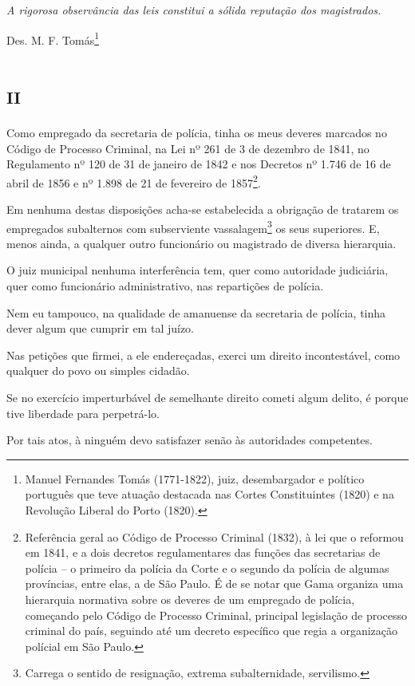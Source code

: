 \emph{A rigorosa observância das leis constitui a sólida reputação dos
magistrados.}

Des. M. F. Tomás\footnote{Manuel Fernandes Tomás (1771-1822), juiz,
  desembargador e político português que teve atuação destacada nas
  Cortes Constituintes (1820) e na Revolução Liberal do Porto (1820).}

\section{\textsc{ii}}

Como empregado da secretaria de polícia, tinha os meus deveres marcados
no Código de Processo Criminal, na Lei nº 261 de 3 de dezembro de 1841,
no Regulamento nº 120 de 31 de janeiro de 1842 e nos Decretos nº 1.746
de 16 de abril de 1856 e nº 1.898 de 21 de fevereiro de 1857\footnote{
  Referência geral ao Código de Processo Criminal (1832), à lei que o
  reformou em 1841, e a dois decretos regulamentares das funções das
  secretarias de polícia -- o primeiro da polícia da Corte e o segundo
  da polícia de algumas províncias, entre elas, a de São Paulo. É de se
  notar que Gama organiza uma hierarquia normativa sobre os deveres de
  um empregado de polícia, começando pelo Código de Processo Criminal,
  principal legislação de processo criminal do país, seguindo até um
  decreto específico que regia a organização polícial em São Paulo.}.

Em nenhuma destas disposições acha-se estabelecida a obrigação de
tratarem os empregados subalternos com subserviente
vassalagem\footnote{Carrega o sentido de resignação, extrema
  subalternidade, servilismo.} os seus superiores. E, menos ainda, a
qualquer outro funcionário ou magistrado de diversa hierarquia.

O juiz municipal nenhuma interferência tem, quer como autoridade
judiciária, quer como funcionário administrativo, nas repartições de
polícia.

Nem eu tampouco, na qualidade de amanuense da secretaria de polícia,
tinha dever algum que cumprir em tal juízo.

Nas petições que firmei, a ele endereçadas, exerci um direito
incontestável, como qualquer do povo ou simples cidadão.

Se no exercício imperturbável de semelhante direito cometi algum delito,
é porque tive liberdade para perpetrá-lo.

Por tais atos, à ninguém devo satisfazer senão às autoridades
competentes.

